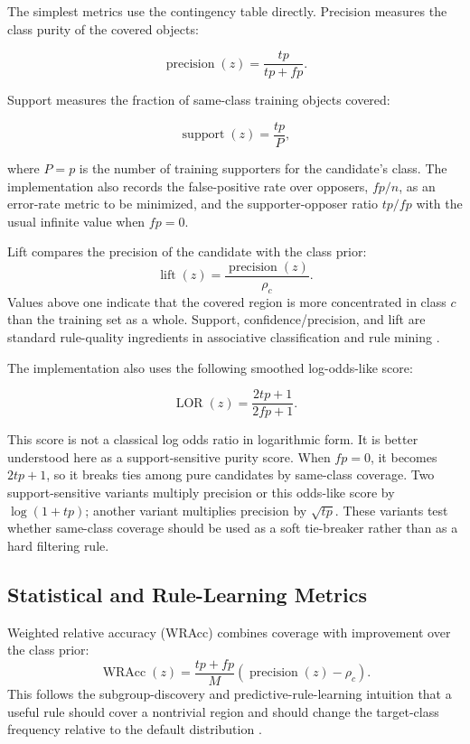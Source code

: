 \documentclass[11pt]{article}
\begin{document}
The simplest metrics use the contingency table directly. Precision measures
the class purity of the covered objects:

\[
    \operatorname{precision}(z) = \frac{tp}{tp + fp}.
\]

Support measures the fraction of same-class training objects covered:

\[
    \operatorname{support}(z) = \frac{tp}{P},
\]

where $P=p$ is the number of training supporters for the candidate's class. The
implementation also records the false-positive rate over opposers,
$fp/n$, as an error-rate metric to be minimized, and the supporter-opposer
ratio $tp/fp$ with the usual infinite value when $fp=0$.

Lift compares the precision of the candidate with the class prior:
\[
    \operatorname{lift}(z) =
    \frac{\operatorname{precision}(z)}{\rho_c}.
\]
Values above one indicate that the covered region is more concentrated in
class $c$ than the training set as a whole. Support, confidence/precision, and
lift are standard rule-quality ingredients in associative classification and
rule mining \cite{liu1998integrating,thabtah2007review}.

The implementation also uses the following smoothed log-odds-like score:

\[
    \operatorname{LOR}(z) = \frac{2tp + 1}{2fp + 1}.
\]

This score is not a classical log odds ratio in logarithmic form. It is better
understood here as a support-sensitive purity score. When $fp=0$, it becomes
$2tp+1$, so it breaks ties among pure candidates by same-class coverage.
Two support-sensitive variants multiply precision or this odds-like score by
$\log(1+tp)$; another variant multiplies precision by $\sqrt{tp}$. These
variants test whether same-class coverage should be used as a soft tie-breaker
rather than as a hard filtering rule.

\subsection{Statistical and Rule-Learning Metrics}

Weighted relative accuracy (WRAcc) combines coverage with improvement over the
class prior:
\[
    \operatorname{WRAcc}(z) =
    \frac{tp+fp}{M}
    \left(\operatorname{precision}(z)-\rho_c\right).
\]
This follows the subgroup-discovery and predictive-rule-learning intuition
that a useful rule should cover a nontrivial region and should change the
target-class frequency relative to the default distribution
\cite{todorovski2000predictive,atzmueller2005exploiting}.
\end{document}
